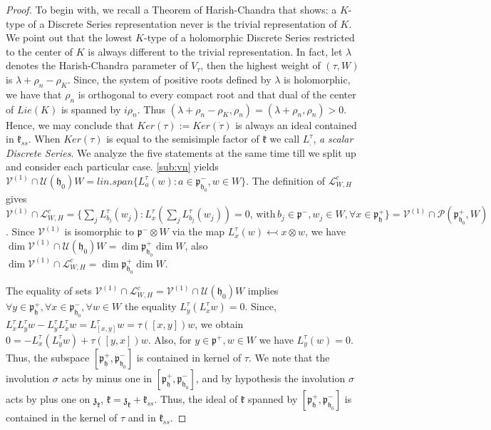\documentclass[12pt]{amsart}
\theoremstyle{definition}
\theoremstyle{remark}
\newcommand{\h}{\mathfrak{h}}
\renewcommand{\k}{{\mathfrak k}}
\newcommand{\p}{\mathfrak p}
\newcommand{\z}{\mathfrak z}
\numberwithin{equation}{section}
\begin{document}
 \begin{proof} To begin with, we recall a Theorem of Harish-Chandra that shows: a $K$-type of a Discrete Series representation never is the trivial representation of $K$. We point out that the lowest $K$-type of a holomorphic Discrete Series restricted to the center of $K$ is always different to the trivial representation. In fact, let $\lambda$ denotes the Harish-Chandra parameter of $V_\tau$, then the highest weight of $(\tau, W)$ is $\lambda+\rho_n -\rho_K$. Since, the system of positive roots defined by $\lambda$ is holomorphic, we have that $\rho_n$ is orthogonal to every compact root and that dual of the center of $Lie(K)$  is spanned by $i\rho_n$. Thus $(\lambda +\rho_n -\rho_K, \rho_n)= (\lambda +\rho_n, \rho_n)>0$. Hence, we may conclude that $Ker(\tau):=Ker( \dot{\tau}) $ is always an ideal contained in $\k_{ss}$. When $Ker(\tau)$ is equal to
  the semisimple factor of $\k$ we call $L_.^\tau$, {\it a scalar Discrete Series}.  We analyze the five statements at the same time till  we split up and consider each particular case.   \ref{sub:vn} yields $ \mathcal V^{(1)}\cap \mathcal U(\h_0)W =lin.span\{ L_a^\tau (w): a\in \p_{\h_0}^- , w \in W\}$. The definition of $\mathcal L_{W,H}^c$ gives  $  \mathcal V^{(1)}\cap \mathcal L_{W,H}^c   =\{ \sum_j L_{b_j}^\tau (w_j): L_x^\tau(  \sum_j L_{b_j}^\tau (w_j))=0, \, \text{with}\, b_j \in \p^- , w_j \in W, \forall x \in \p_{\h}^+ \}= \mathcal V^{(1)}\cap \mathcal P(\p_{\h_0}^+,W)$.
Since $\mathcal V^{(1)}$ is isomorphic to $\p^- \otimes W$ via the map $L_x^\tau(w)\leftarrowtail x\otimes w$, we have $\dim \mathcal V^{(1)}\cap \mathcal U(\h_0)W = \dim \p_{\h_0}^+ \dim W $, also $\dim  \mathcal V^{(1)}\cap \mathcal L_{W,H}^c   = \dim \p_{\h_0}^+ \dim W$.


 The equality of sets   $  \mathcal V^{(1)}\cap \mathcal L_{W,H}^c   = \mathcal V^{(1)}\cap \mathcal U(\h_0)W $ implies $\forall y \in \p_{\h}^+, \forall x \in \p_{\h_0}^-, \forall w\in W$ the equality $ L_y^\tau(L_x^\tau w)=0$. Since, $L_x^\tau L_y^\tau w -L_y^\tau L_x^\tau w =L_{[x,y]}^\tau w =\tau([x,y])w$, we obtain
 $0=-L_x^\tau (L_y^\tau w)+\tau([y,x])w$. Also, for $y\in \p^+, w \in W$ we have $L_y^\tau (w)=0$. Thus, the subspace $[\p_\h^+,\p_{\h_0}^-]$ is contained in kernel of $\tau$. We note  that the involution $\sigma$ acts by minus one in  $[\p_\h^+,\p_{\h_0}^-]$, and by hypothesis the involution $\sigma$ acts by plus one on $\z_\k$,  $\k=\z_\k +\k_{ss}$.  Thus, the ideal of $\k$  spanned by $[\p_\h^+,\p_{\h_0}^-]$  is contained in the kernel of $\tau$ and  in $\k_{ss}$.


\end{proof}
\end{document}
